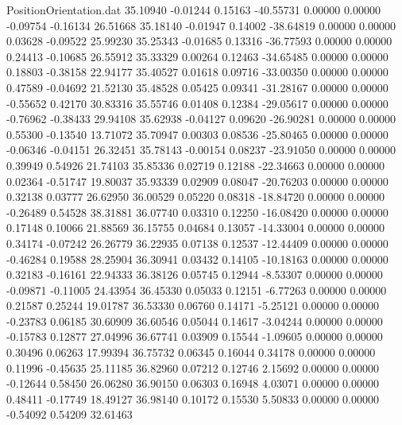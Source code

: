 \begin{filecontents}{PositionOrientation.dat}
  35.10940   -0.01244    0.15163   -40.55731    0.00000    0.00000   -0.09754   -0.16134   26.51668
  35.18140   -0.01947    0.14002   -38.64819    0.00000    0.00000    0.03628   -0.09522   25.99230
  35.25343   -0.01685    0.13316   -36.77593    0.00000    0.00000    0.24413   -0.10685   26.55912
  35.33329    0.00264    0.12463   -34.65485    0.00000    0.00000    0.18803   -0.38158   22.94177
  35.40527    0.01618    0.09716   -33.00350    0.00000    0.00000    0.47589   -0.04692   21.52130
  35.48528    0.05425    0.09341   -31.28167    0.00000    0.00000   -0.55652    0.42170   30.83316
  35.55746    0.01408    0.12384   -29.05617    0.00000    0.00000   -0.76962   -0.38433   29.94108
  35.62938   -0.04127    0.09620   -26.90281    0.00000    0.00000    0.55300   -0.13540   13.71072
  35.70947    0.00303    0.08536   -25.80465    0.00000    0.00000   -0.06346   -0.04151   26.32451
  35.78143   -0.00154    0.08237   -23.91050    0.00000    0.00000    0.39949    0.54926   21.74103
  35.85336    0.02719    0.12188   -22.34663    0.00000    0.00000    0.02364   -0.51747   19.80037
  35.93339    0.02909    0.08047   -20.76203    0.00000    0.00000    0.32138    0.03777   26.62950
  36.00529    0.05220    0.08318   -18.84720    0.00000    0.00000   -0.26489    0.54528   38.31881
  36.07740    0.03310    0.12250   -16.08420    0.00000    0.00000    0.17148    0.10066   21.88569
  36.15755    0.04684    0.13057   -14.33004    0.00000    0.00000    0.34174   -0.07242   26.26779
  36.22935    0.07138    0.12537   -12.44409    0.00000    0.00000   -0.46284    0.19588   28.25904
  36.30941    0.03432    0.14105   -10.18163    0.00000    0.00000    0.32183   -0.16161   22.94333
  36.38126    0.05745    0.12944    -8.53307    0.00000    0.00000   -0.09871   -0.11005   24.43954
  36.45330    0.05033    0.12151    -6.77263    0.00000    0.00000    0.21587    0.25244   19.01787
  36.53330    0.06760    0.14171    -5.25121    0.00000    0.00000   -0.23783    0.06185   30.60909
  36.60546    0.05044    0.14617    -3.04244    0.00000    0.00000   -0.15783    0.12877   27.04996
  36.67741    0.03909    0.15544    -1.09605    0.00000    0.00000    0.30496    0.06263   17.99394
  36.75732    0.06345    0.16044     0.34178    0.00000    0.00000    0.11996   -0.45635   25.11185
  36.82960    0.07212    0.12746     2.15692    0.00000    0.00000   -0.12644    0.58450   26.06280
  36.90150    0.06303    0.16948     4.03071    0.00000    0.00000    0.48411   -0.17749   18.49127
  36.98140    0.10172    0.15530     5.50833    0.00000    0.00000   -0.54092    0.54209   32.61463

\end{filecontents}
